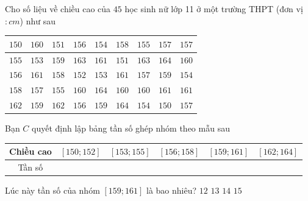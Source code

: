 \begin{ex}%
	Cho số liệu về chiều cao của $45$ học sinh nữ lớp 11 ở một trường THPT (đơn vị$\colon cm$) như sau 
	\begin{center}
		\begin{tabular}{|c|c|c|c|c|c|c|c|c|}
			 \hline
			$150$ & $160$ & $151$ & $156$ &  $154$ & $158$ & $155$ & $157$ & $157$ \\
			\hline 
			$155$ & $153$ & $159$ & $163$ & $161$ & $151$ & $163$ &  $164$ & $160$ \\
			\hline 
			$156$ & $161$ &  $158$ & $152$ & $153$ & $161$ & $157$ & $159$ & $154$ \\
			\hline 
			$158$ & $157$ & $155$ & $160$ & $164$  & $160$ & $160$ & $161$ & $161$ \\
			 \hline
			$162$ & $159$ & $162$ & $156$ & $159$ & $164$ & $154$ &  $150$ & $157$\\
			\hline 
		\end{tabular}
	\end{center}
	 Bạn $C$ quyết định lập bảng tần số ghép nhóm theo mẫu sau
	\begin{center}
		\begin{tabular}{|c|c|c|c|c|c|}
			\hline 
			Chiều cao & $[150;152]$ & $[153;155]$ &  $[156;158]$ & $[159;161]$ & $[162;164]$ \\
			 \hline
			Tần số  &&&&&\\
			\hline 
		\end{tabular}
	\end{center}
	Lúc này tần  số của nhóm $[159;161]$ là bao nhiêu?
	 \choice
		 {$12$}
		 {$13$}
		{\True $14$} 
		 {$15$}
\end{ex}

